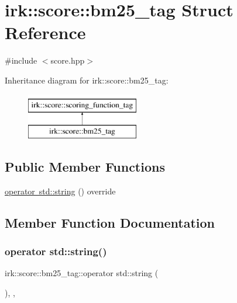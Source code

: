 \hypertarget{structirk_1_1score_1_1bm25__tag}{}\section{irk\+:\+:score\+:\+:bm25\+\_\+tag Struct Reference}
\label{structirk_1_1score_1_1bm25__tag}


{\ttfamily \#include $<$score.\+hpp$>$}

Inheritance diagram for irk\+:\+:score\+:\+:bm25\+\_\+tag\+:\begin{figure}[H]
\begin{center}
\leavevmode
\includegraphics[height=2.000000cm]{structirk_1_1score_1_1bm25__tag}
\end{center}
\end{figure}
\subsection*{Public Member Functions}
\begin{DoxyCompactItemize}
\item 
\mbox{\hyperlink{structirk_1_1score_1_1bm25__tag_a3575a5c838ad5a235198d525e665e0f1}{operator std\+::string}} () override
\end{DoxyCompactItemize}


\subsection{Member Function Documentation}
\mbox{\label{structirk_1_1score_1_1bm25__tag_a3575a5c838ad5a235198d525e665e0f1}} 
\subsubsection{\texorpdfstring{operator std\+::string()}{operator std::string()}}
{\footnotesize\ttfamily irk\+::score\+::bm25\+\_\+tag\+::operator std\+::string (\begin{DoxyParamCaption}{ }\end{DoxyParamCaption})\hspace{0.3cm}{\ttfamily [inline]}, {\ttfamily [override]}, {\ttfamily [virtual]}}



